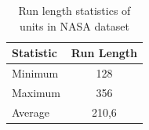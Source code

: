 \documentclass[english, a4paper]{report}
\begin{document}
{{{            \begin{table}[H]
                \centering
                \begin{tabular}{|l|l|}
                    \hline
                    \textbf{Statistic} & \multicolumn{1}{l|}{\textbf{Run Length}} \\ \hline
                    Minimum            & \multicolumn{1}{c|}{128}    \\ \hline
                    Maximum            & \multicolumn{1}{c|}{356}    \\ \hline
                    Average            & \multicolumn{1}{c|}{210,6}  \\ \hline
                \end{tabular}
                \caption{Run length statistics of units in NASA dataset}
                \label{nasaRunLength}
            \end{table}
            \par   
        }
    
}}
\end{document}

